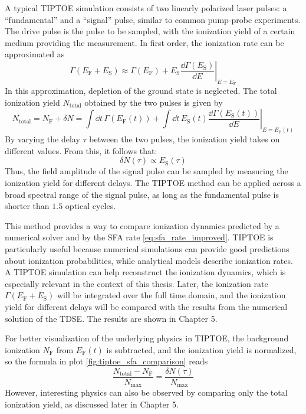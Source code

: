 A typical TIPTOE simulation consists of two linearly polarized laser pulses: a ``fundamental'' and a ``signal'' pulse, similar to common pump-probe experiments.
The drive pulse is the pulse to be sampled, with the ionization yield of a certain medium providing the measurement.
In first order, the ionization rate can be approximated as
\begin{equation}
    \Gamma(E_{\mathrm{F}}+E_{\mathrm{S}})\approx\Gamma(E_{\mathrm{F}})+\left.E_{\mathrm{S}}\frac{\dd \Gamma(E_{\mathrm{S}})}{\dd E}\right|_{E=E_{\mathrm{F}}}
\end{equation}
In this approximation, depletion of the ground state is neglected.
The total ionization yield $N_{\mathrm{total}}$ obtained by the two pulses is given by
\begin{equation*}
    N_{\mathrm{total}}=N_{\mathrm{F}}+\delta N = \int \dd t\,\Gamma(E_{\mathrm{F}}(t))+\int \dd t\,E_{\mathrm{S}}(t)\left.\frac{\dd \Gamma(E_{\mathrm{S}}(t))}{\dd E}\right|_{E=E_{\mathrm{F}}(t)}
\end{equation*}
By varying the delay $\tau$ between the two pulses, the ionization yield takes on different values.
From this, it follows that:
\begin{equation}
    \delta N(\tau)\propto E_{\mathrm{S}}(\tau) \label{eq:tiptoeprop}
\end{equation}
Thus, the field amplitude of the signal pulse can be sampled by measuring the ionization yield for different delays.
The TIPTOE method can be applied across a broad spectral range of the signal pulse, as long as the fundamental pulse is shorter than $1.5$ optical cycles.

\bigskip
This method provides a way to compare ionization dynamics predicted by a numerical solver and by the SFA rate \eqref{eq:sfa_rate_improved}.
TIPTOE is particularly useful because numerical simulations can provide good predictions about ionization probabilities, while analytical models describe ionization rates.
A TIPTOE simulation can help reconstruct the ionization dynamics, which is especially relevant in the context of this thesis.
Later, the ionization rate $\Gamma(E_{\mathrm{F}}+E_{\mathrm{S}})$ will be integrated over the full time domain, and the ionization yield for different delays will be compared with the results from the numerical solution of the TDSE.
The results are shown in Chapter 5.

For better visualization of the underlying physics in TIPTOE, the background ionization $N_{\mathrm{F}}$ from $E_\mathrm{F}(t)$ is subtracted, and the ionization yield is normalized, so the formula in plot \ref{fig:tiptoe_sfa_comparison} reads
\begin{equation}
    \frac{N_{\mathrm{total}}-N_{\mathrm{F}}}{N_{\mathrm{max}}}=\frac{\delta N(\tau)}{N_{\mathrm{max}}}      \label{eq:tiptoeprop_normalized}
\end{equation}
However, interesting physics can also be observed by comparing only the total ionization yield, as discussed later in Chapter 5.

